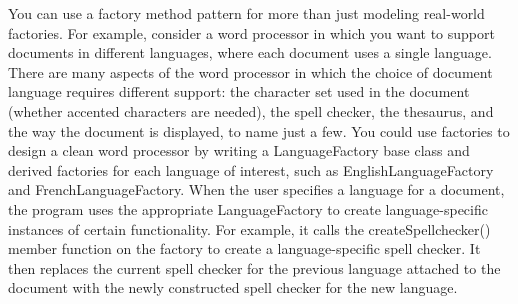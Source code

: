 
You can use a factory method pattern for more than just modeling real-world factories. For example, consider a word processor in which you want to support documents in different languages, where each document uses a single language. There are many aspects of the word processor in which the choice of document language requires different support: the character set used in the document (whether accented characters are needed), the spell checker, the thesaurus, and the way the document is displayed, to name just a few. You could use factories to design a clean word processor by writing a LanguageFactory base class and derived factories for each language of interest, such as EnglishLanguageFactory and FrenchLanguageFactory. When the user specifies a language for a document, the program uses the appropriate LanguageFactory to create language-specific instances of certain functionality. For example, it calls the createSpellchecker() member function on the factory to create a language-specific spell checker. It then replaces the current spell checker for the previous language attached to the document with the newly constructed spell checker for the new language.







